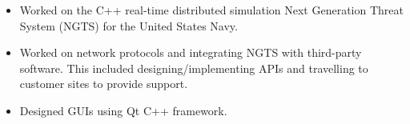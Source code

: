 \documentclass[10pt,a4paper,ragged2e,withhyper]{custom}
\begin{document}
\begin{paracol}{2}
\divider

\begin{itemize}
  \item Worked on the C++ real-time distributed simulation Next Generation Threat System (NGTS) for the United States Navy.
  \item Worked on network protocols and integrating NGTS with third-party software. This included designing/implementing APIs and travelling to customer sites to provide support.
  \item Designed GUIs using Qt C++ framework.
\end{itemize}

\end{paracol}
\end{document}
